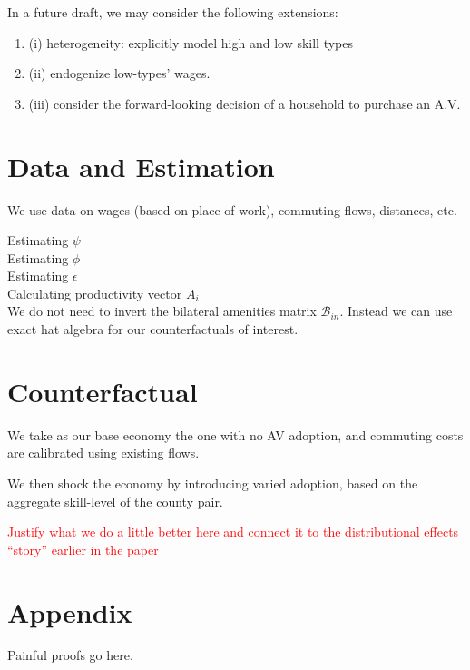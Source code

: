 \documentclass{article}
\begin{document}
In a future draft, we may consider the following extensions: 
\begin{enumerate}
\item  (i) heterogeneity: explicitly model high and low skill types
 \item (ii) endogenize low-types' wages.
\item (iii) consider the forward-looking decision of a household to purchase an A.V.
\end{enumerate}



\section{Data and Estimation}
We use data on wages (based on place of work), commuting flows, distances, etc.



Estimating $\psi$ \\
Estimating $\phi$ \\ 
Estimating $\epsilon$ \\
Calculating productivity vector $A_i$ \\


We do not need to invert the bilateral amenities matrix $\mathcal{B}_{in}$. Instead we can use exact hat algebra for our counterfactuals of interest. 




\section{Counterfactual}

We take as our base economy the one with no AV adoption, and commuting costs are calibrated using existing flows.

We then shock the economy by introducing varied adoption, based on the aggregate skill-level of the county pair.

\textcolor{red}{Justify what we do a little better here and connect it to the distributional effects ``story'' earlier in the paper}



\section{Appendix}
Painful proofs go here.


\end{document}
